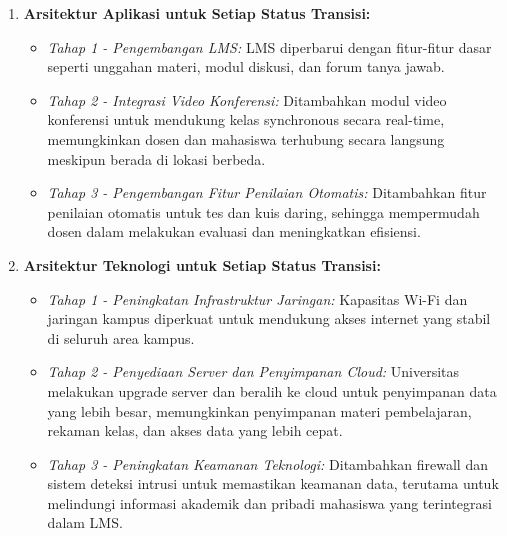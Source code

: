 \begin{enumerate}
	\item \textbf{Arsitektur Aplikasi untuk Setiap Status Transisi:}
	\begin{itemize}
		\item \textit{Tahap 1 - Pengembangan LMS:} 
		LMS diperbarui dengan fitur-fitur dasar seperti unggahan materi, modul diskusi, dan forum tanya jawab.
		\item \textit{Tahap 2 - Integrasi Video Konferensi:} 
		Ditambahkan modul video konferensi untuk mendukung kelas synchronous secara real-time, memungkinkan dosen dan mahasiswa terhubung secara langsung meskipun berada di lokasi berbeda.
		\item \textit{Tahap 3 - Pengembangan Fitur Penilaian Otomatis:} 
		Ditambahkan fitur penilaian otomatis untuk tes dan kuis daring, sehingga mempermudah dosen dalam melakukan evaluasi dan meningkatkan efisiensi.
	\end{itemize}
	
	\item \textbf{Arsitektur Teknologi untuk Setiap Status Transisi:}
	\begin{itemize}
		\item \textit{Tahap 1 - Peningkatan Infrastruktur Jaringan:} 
		Kapasitas Wi-Fi dan jaringan kampus diperkuat untuk mendukung akses internet yang stabil di seluruh area kampus.
		\item \textit{Tahap 2 - Penyediaan Server dan Penyimpanan Cloud:} 
		Universitas melakukan upgrade server dan beralih ke cloud untuk penyimpanan data yang lebih besar, memungkinkan penyimpanan materi pembelajaran, rekaman kelas, dan akses data yang lebih cepat.
		\item \textit{Tahap 3 - Peningkatan Keamanan Teknologi:} 
		Ditambahkan firewall dan sistem deteksi intrusi untuk memastikan keamanan data, terutama untuk melindungi informasi akademik dan pribadi mahasiswa yang terintegrasi dalam LMS.
	\end{itemize}
\end{enumerate}

